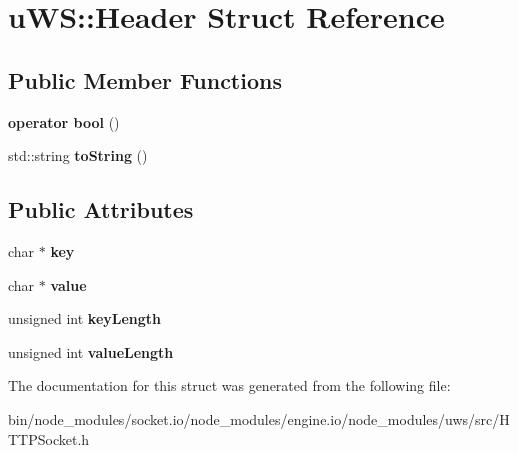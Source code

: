 \hypertarget{structu_w_s_1_1_header}{}\section{u\+WS\+:\+:Header Struct Reference}
\label{structu_w_s_1_1_header}
\subsection*{Public Member Functions}
\begin{DoxyCompactItemize}
\item 
\mbox{\label{structu_w_s_1_1_header_a7a047e9ca96b26e6686ddfaa9526a277}} 
{\bfseries operator bool} ()
\item 
\mbox{\label{structu_w_s_1_1_header_a6fe12d1d73c0f2917fde7921b5492daf}} 
std\+::string {\bfseries to\+String} ()
\end{DoxyCompactItemize}
\subsection*{Public Attributes}
\begin{DoxyCompactItemize}
\item 
\mbox{\label{structu_w_s_1_1_header_a938f112fb517957635229a8ddd633ac6}} 
char $\ast$ {\bfseries key}
\item 
\mbox{\label{structu_w_s_1_1_header_af466a6f072e5544035b8cee3a9ff2e32}} 
char $\ast$ {\bfseries value}
\item 
\mbox{\label{structu_w_s_1_1_header_a039856c1d97855f7a383b7421dcb8411}} 
unsigned int {\bfseries key\+Length}
\item 
\mbox{\label{structu_w_s_1_1_header_aa7abf375a13b52c1404e25c59f8e476e}} 
unsigned int {\bfseries value\+Length}
\end{DoxyCompactItemize}


The documentation for this struct was generated from the following file\+:\begin{DoxyCompactItemize}
\item 
bin/node\+\_\+modules/socket.\+io/node\+\_\+modules/engine.\+io/node\+\_\+modules/uws/src/H\+T\+T\+P\+Socket.\+h\end{DoxyCompactItemize}
